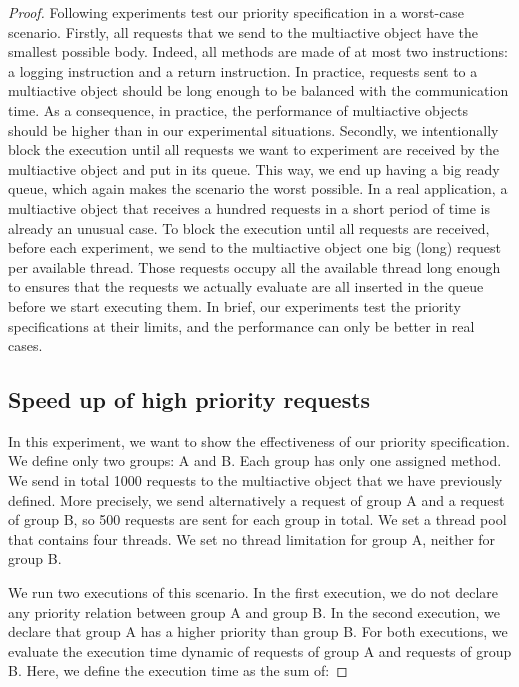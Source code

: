 \documentclass[11pt]{report}
\begin{document}
\begin{proof}
Following experiments test our priority specification in a worst-case scenario. Firstly, all requests that we send to the multiactive object have the smallest possible body. Indeed, all methods are made of at most two instructions: a logging instruction and a return instruction.
In practice, requests sent to a multiactive object should be long enough to be balanced with the communication time. As a consequence, in practice, the performance of multiactive objects should be higher than in our experimental situations.
Secondly, we intentionally block the execution until all requests we want to experiment are received by the multiactive object and put in its queue. This way, we end up having a big ready queue, which again makes the scenario the worst possible. In a real application, a multiactive object that receives a hundred requests in a short period of time is already an unusual case. To block the execution until all requests are received, before each experiment, we send to the multiactive object one big (long) request per available thread. Those requests occupy all the available thread long enough to ensures that the requests we actually evaluate are all inserted in the queue before we start executing them.
In brief, our experiments test the priority specifications at their limits, and the performance can only be better in real cases.



\subsection{Speed up of high priority requests}
In this experiment, we want to show the effectiveness of our priority specification. We define only two groups: A and B. Each group has only one assigned method. We send in total 1000 requests to the multiactive object that we have previously defined. More precisely, we send alternatively a request of group A and a request of group B, so 500 requests are sent for each group in total. We set a thread pool that contains four threads. We set no thread limitation for group A, neither for group B.

We run two executions of this scenario. In the first execution, we do not declare any priority relation between group A and group B. In the second execution, we declare that group A has a higher priority than group B. For both executions, we evaluate the execution time dynamic of requests of group A and requests of group B. Here, we define the execution time as the sum of:


\end{proof}
\end{document}
